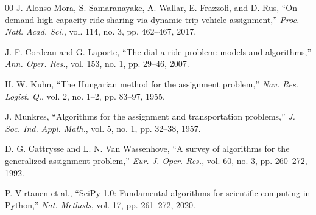 \documentclass[sigconf]{acmart}
\begin{document}
\begin{thebibliography}{00}
 J. Alonso-Mora, S. Samaranayake, A. Wallar, E. Frazzoli, and D. Rus, ``On-demand high-capacity ride-sharing via dynamic trip-vehicle assignment,'' \textit{Proc. Natl. Acad. Sci.}, vol. 114, no. 3, pp. 462--467, 2017.

 J.-F. Cordeau and G. Laporte, ``The dial-a-ride problem: models and algorithms,'' \textit{Ann. Oper. Res.}, vol. 153, no. 1, pp. 29--46, 2007.

 H. W. Kuhn, ``The Hungarian method for the assignment problem,'' \textit{Nav. Res. Logist. Q.}, vol. 2, no. 1--2, pp. 83--97, 1955.

 J. Munkres, ``Algorithms for the assignment and transportation problems,'' \textit{J. Soc. Ind. Appl. Math.}, vol. 5, no. 1, pp. 32--38, 1957.

 D. G. Cattrysse and L. N. Van Wassenhove, ``A survey of algorithms for the generalized assignment problem,'' \textit{Eur. J. Oper. Res.}, vol. 60, no. 3, pp. 260--272, 1992.

 P. Virtanen et al., ``SciPy 1.0: Fundamental algorithms for scientific computing in Python,'' \textit{Nat. Methods}, vol. 17, pp. 261--272, 2020.
\end{thebibliography}
\end{document}
